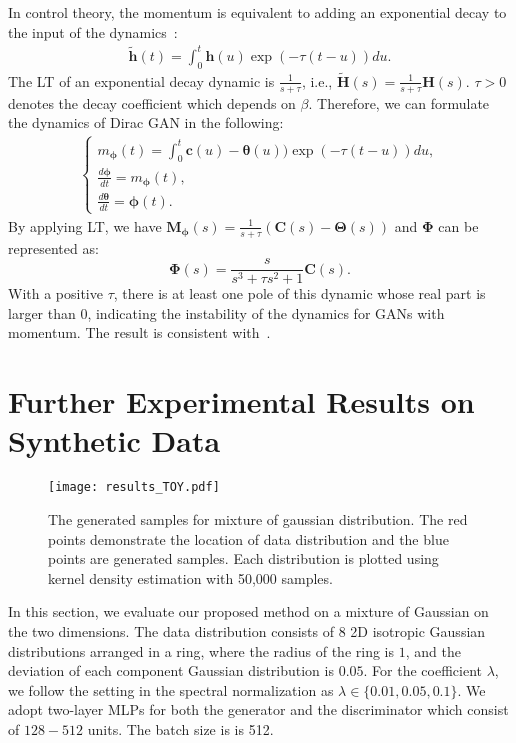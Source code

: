 \documentclass{article}
\newcommand{\tc}{\bm{c}}
\newcommand{\tth}{\bm{h}}
\newcommand{\ttheta}{\bm{\theta}}
\newcommand{\tphi}{\bm{\phi}}
\newcommand{\fC}{\bm{C}}
\newcommand{\fH}{\bm{H}}
\newcommand{\fM}{\bm{M}}
\newcommand{\fTheta}{\bm{\Theta}}
\newcommand{\fPhi}{\bm{\Phi}}
\theoremstyle{definition}
\begin{document}
In control theory, the momentum is equivalent to adding an exponential decay to the input of the dynamics~\citep{an2018pid}:
\begin{align}
\tilde{\tth}(t) = \int_0^t \tth(u) \exp(-\tau(t-u))du.
\end{align}
The LT of an exponential decay dynamic is $\frac{1}{s+\tau}$, i.e., $\tilde{\fH}(s) = \frac{1}{s+\tau}\fH(s)$. $\tau > 0$ denotes the decay coefficient which depends on $\beta$.
Therefore, we can formulate the dynamics of Dirac GAN in the following:
\begin{align}
\begin{cases}
m_{\tphi}(t) = \int_0^t \tc(u) - \ttheta(u)) \exp(-\tau(t-u))du,\\
\frac{d\tphi}{dt} = m_{\tphi}(t), \\
\frac{d\ttheta}{dt} = \tphi(t).
\end{cases}\label{eqn:dynamic_momentum}
\end{align}
By applying LT, we have $\fM_{\tphi}(s) = \frac{1}{s+\tau}(\fC(s)-\fTheta(s))$ and $\fPhi$ can be represented as:
$$\fPhi(s) = \frac{s}{s^3 + \tau s^2 + 1}\fC(s).$$
With a positive $\tau$, there is at least one pole of this dynamic whose real part is larger than $0$, indicating the instability of the dynamics for GANs with momentum.
The result is consistent with~\cite{gidel2018negative}.




















\section{Further Experimental Results on Synthetic Data}

\begin{figure*}
    \centering
    \texttt{[image: results\_TOY.pdf]}
\caption{The generated samples for mixture of gaussian distribution. The red points demonstrate the location of data distribution and the blue points are generated samples. Each distribution is plotted using kernel density estimation with 50,000 samples. }
    \label{fig:result_toy}
\end{figure*}

In this section, we evaluate our proposed method on a mixture of Gaussian on the two dimensions. The data distribution consists of $8$ 2D isotropic Gaussian distributions arranged in a ring, where the radius of the ring is $1$, and the deviation of each component Gaussian distribution is $0.05$. For the coefficient $\lambda$, we follow the setting in the spectral normalization as $\lambda\in\{0.01, 0.05, 0.1\}$. We adopt two-layer MLPs for both the generator and the discriminator which consist of $128-512$ units. The batch size is is 512.
\end{document}
